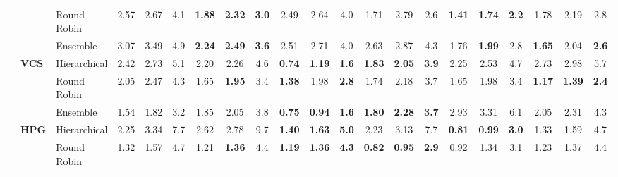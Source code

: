 {\begin{longtable}{@{\extracolsep{\fill}}lllccc|ccc|ccc|ccc|ccc|ccc}
 &  & Round Robin & 2.57 & 2.67 & 4.1 & \textbf{1.88} & \textbf{2.32} & \textbf{3.0} & \cellcolor{colorrr}2.49 & \cellcolor{colorrr}2.64 & \cellcolor{colorrr}4.0 & \cellcolor{colorrr}1.71 & \cellcolor{colorrr}2.79 & \cellcolor{colorrr}2.6 & \cellcolor{colorrr}\textbf{1.41} & \cellcolor{colorrr}\textbf{1.74} & \cellcolor{colorrr}\textbf{2.2} & 1.78 & 2.19 & 2.8 \\
 &  & Ensemble & 3.07 & 3.49 & 4.9 & \textbf{2.24} & \textbf{2.49} & \textbf{3.6} & 2.51 & 2.71 & \cellcolor{colorens}4.0 & 2.63 & 2.87 & 4.3 & 1.76 & \textbf{1.99} & 2.8 & \cellcolor{colorens}\textbf{1.65} & \cellcolor{colorens}2.04 & \cellcolor{colorens}\textbf{2.6} \\
\cmidrule(lr){2-21}
 & \multirow{3}{*}{\textbf{VCS}} & Hierarchical & 2.42 & 2.73 & 5.1 & 2.20 & 2.26 & 4.6 & \cellcolor{colorhier}\textbf{0.74} & \textbf{1.19} & \cellcolor{colorhier}\textbf{1.6} & \textbf{1.83} & \cellcolor{colorhier}\textbf{2.05} & \textbf{3.9} & 2.25 & 2.53 & 4.7 & 2.73 & 2.98 & 5.7 \\
 &  & Round Robin & 2.05 & 2.47 & 4.3 & \cellcolor{colorrr}1.65 & \cellcolor{colorrr}\textbf{1.95} & \cellcolor{colorrr}3.4 & \textbf{1.38} & 1.98 & \textbf{2.8} & \cellcolor{colorrr}1.74 & 2.18 & \cellcolor{colorrr}3.7 & \cellcolor{colorrr}1.65 & \cellcolor{colorrr}1.98 & \cellcolor{colorrr}3.4 & \cellcolor{colorrr}\textbf{1.17} & \cellcolor{colorrr}\textbf{1.39} & \cellcolor{colorrr}\textbf{2.4} \\
 &  & Ensemble & \cellcolor{colorens}1.54 & \cellcolor{colorens}1.82 & \cellcolor{colorens}3.2 & 1.85 & 2.05 & 3.8 & \textbf{0.75} & \cellcolor{colorens}\textbf{0.94} & \cellcolor{colorens}\textbf{1.6} & \textbf{1.80} & \textbf{2.28} & \cellcolor{colorens}\textbf{3.7} & 2.93 & 3.31 & 6.1 & 2.05 & 2.31 & 4.3 \\
\cmidrule(lr){2-21}
 & \multirow{3}{*}{\textbf{HPG}} & Hierarchical & 2.25 & 3.34 & 7.7 & 2.62 & 2.78 & 9.7 & \textbf{1.40} & \textbf{1.63} & \textbf{5.0} & 2.23 & 3.13 & 7.7 & \cellcolor{colorhier}\textbf{0.81} & \cellcolor{colorhier}\textbf{0.99} & \cellcolor{colorhier}\textbf{3.0} & 1.33 & 1.59 & 4.7 \\
 &  & Round Robin & \cellcolor{colorrr}1.32 & \cellcolor{colorrr}1.57 & \cellcolor{colorrr}4.7 & 1.21 & \textbf{1.36} & 4.4 & \cellcolor{colorrr}\textbf{1.19} & \cellcolor{colorrr}\textbf{1.36} & \cellcolor{colorrr}\textbf{4.3} & \cellcolor{colorrr}\textbf{0.82} & \cellcolor{colorrr}\textbf{0.95} & \cellcolor{colorrr}\textbf{2.9} & 0.92 & 1.34 & 3.1 & 1.23 & \cellcolor{colorrr}1.37 & 4.4 \\

\end{longtable}}
